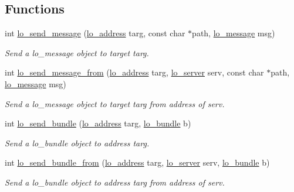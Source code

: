\subsection*{Functions}
\begin{DoxyCompactItemize}
\item 
int \hyperlink{group__liblolowlevel_ga175a13c6d81adf5c346cdca9bbdcf225}{lo\+\_\+send\+\_\+message} (\hyperlink{lo__types_8h_abf9b53223467de596b89e1377b0f3f3d}{lo\+\_\+address} targ, const char $\ast$path, \hyperlink{lo__types_8h_ad126083c98d941f00eb72d1690b38d63}{lo\+\_\+message} msg)
\begin{DoxyCompactList}\small\item\em Send a lo\+\_\+message object to target targ. \end{DoxyCompactList}\item 
int \hyperlink{group__liblolowlevel_ga9d1aa7c1ee1ce60fe0cf7e3f1e5a6822}{lo\+\_\+send\+\_\+message\+\_\+from} (\hyperlink{lo__types_8h_abf9b53223467de596b89e1377b0f3f3d}{lo\+\_\+address} targ, \hyperlink{lo__types_8h_a59067bf50cf8abb4371da6f03c9036c9}{lo\+\_\+server} serv, const char $\ast$path, \hyperlink{lo__types_8h_ad126083c98d941f00eb72d1690b38d63}{lo\+\_\+message} msg)
\begin{DoxyCompactList}\small\item\em Send a lo\+\_\+message object to target targ from address of serv. \end{DoxyCompactList}\item 
int \hyperlink{group__liblolowlevel_gad1138d0f777693ae0321e3da65aee53e}{lo\+\_\+send\+\_\+bundle} (\hyperlink{lo__types_8h_abf9b53223467de596b89e1377b0f3f3d}{lo\+\_\+address} targ, \hyperlink{lo__types_8h_a96254950ad34e9cfbf8a6613fc74025b}{lo\+\_\+bundle} b)
\begin{DoxyCompactList}\small\item\em Send a lo\+\_\+bundle object to address targ. \end{DoxyCompactList}\item 
int \hyperlink{group__liblolowlevel_gab5de220b7d6d7c2bf6b0ca4316a54b7a}{lo\+\_\+send\+\_\+bundle\+\_\+from} (\hyperlink{lo__types_8h_abf9b53223467de596b89e1377b0f3f3d}{lo\+\_\+address} targ, \hyperlink{lo__types_8h_a59067bf50cf8abb4371da6f03c9036c9}{lo\+\_\+server} serv, \hyperlink{lo__types_8h_a96254950ad34e9cfbf8a6613fc74025b}{lo\+\_\+bundle} b)
\begin{DoxyCompactList}\small\item\em Send a lo\+\_\+bundle object to address targ from address of serv. \end{DoxyCompactList}\item 

\end{DoxyCompactItemize}
